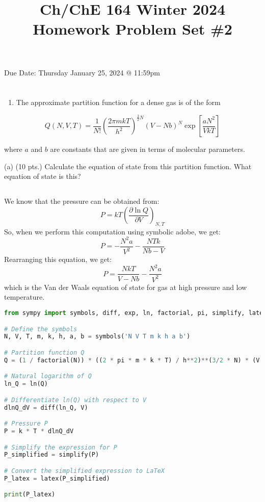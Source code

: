 \documentclass[10pt]{article}
\title{Ch/ChE 164 Winter 2024 
 Homework Problem Set \#2 }
\author{}
\date{}
\begin{document}
\maketitle
Due Date: Thursday January 25, 2024 @ 11:59pm
\section{}
\begin{enumerate}
  \item The approximate partition function for a dense gas is of the form
\end{enumerate}

$$
Q(N, V, T)=\frac{1}{N !}\left(\frac{2 \pi m k T}{h^{2}}\right)^{\frac{3}{2} N}(V-N b)^{N} \exp \left[\frac{a N^{2}}{V k T}\right]
$$

where $a$ and $b$ are constants that are given in terms of molecular parameters.

(a) (10 pts.) Calculate the equation of state from this partition function. What equation of state is this?
\subsection{}
We know that the pressure can be obtained from:
\begin{equation}
  P = kT \left( \frac{\partial \ln Q}{\partial V} \right)_{N,T}
\end{equation}
So, when we perform this computation using symbolic adobe, we get:
\begin{equation}
  P = - \frac{N^{2} a}{V^{2}} - \frac{N T k}{N b - V}
\end{equation}
Rearranging this equation, we get:
\begin{equation}
  P = \frac{N k T}{V - N b} - \frac{N^{2} a}{V^{2}}
\end{equation}
which is the Van der Waals equation of state for gas at high pressure and low temperature.
\begin{lstlisting}[language=Python]
from sympy import symbols, diff, exp, ln, factorial, pi, simplify, latex

# Define the symbols
N, V, T, m, k, h, a, b = symbols('N V T m k h a b')

# Partition function Q
Q = (1 / factorial(N)) * ((2 * pi * m * k * T) / h**2)**(3/2 * N) * (V - N * b)**N * exp(a * N**2 / (V * k * T))

# Natural logarithm of Q
ln_Q = ln(Q)

# Differentiate ln(Q) with respect to V
dlnQ_dV = diff(ln_Q, V)

# Pressure P
P = k * T * dlnQ_dV

# Simplify the expression for P
P_simplified = simplify(P)

# Convert the simplified expression to LaTeX
P_latex = latex(P_simplified)

print(P_latex)

\end{lstlisting}
\end{document}
